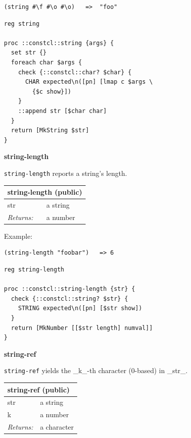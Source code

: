 \documentclass[twoside,9pt]{report}
\begin{document}
\noindent\makebox[\linewidth]{\rule{\linewidth}{0.4pt}}
\begin{lstlisting}
(string #\f #\o #\o)   =>  "foo"
\end{lstlisting}
\noindent\makebox[\linewidth]{\rule{\linewidth}{0.4pt}}
\noindent\makebox[\linewidth]{\rule{\linewidth}{0.4pt}}
\begin{lstlisting}
reg string
 
proc ::constcl::string {args} {
  set str {}
  foreach char $args {
    check {::constcl::char? $char} {
      CHAR expected\n([pn] [lmap c $args \
        {$c show}])
    }
    ::append str [$char char]
  }
  return [MkString $str]
}
\end{lstlisting}
\noindent\makebox[\linewidth]{\rule{\linewidth}{0.4pt}}

\textbf{string-length}


\texttt{string-length} reports a string's length.

\begin{tabular}{ |l l| }
\hline
\multicolumn{2}{|l|}{string-length (public)} \\
\hline
str & a string \\
\textit{Returns:} & a number \\
\hline
\end{tabular}


Example:

\noindent\makebox[\linewidth]{\rule{\linewidth}{0.4pt}}
\begin{lstlisting}
(string-length "foobar")   => 6
\end{lstlisting}
\noindent\makebox[\linewidth]{\rule{\linewidth}{0.4pt}}
\noindent\makebox[\linewidth]{\rule{\linewidth}{0.4pt}}
\begin{lstlisting}
reg string-length
 
proc ::constcl::string-length {str} {
  check {::constcl::string? $str} {
    STRING expected\n([pn] [$str show])
  }
  return [MkNumber [[$str length] numval]]
}
\end{lstlisting}
\noindent\makebox[\linewidth]{\rule{\linewidth}{0.4pt}}

\textbf{string-ref}


\texttt{string-ref} yields the \_k\_-th character (0-based) in \_str\_.

\begin{tabular}{ |l l| }
\hline
\multicolumn{2}{|l|}{string-ref (public)} \\
\hline
str & a string \\
k & a number \\
\textit{Returns:} & a character \\
\hline
\end{tabular}
\end{document}
